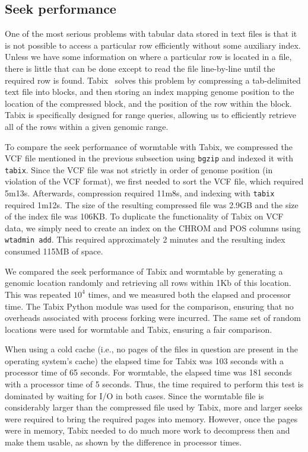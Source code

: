 \documentclass[10pt]{bmc_article}
\newenvironment{bmcformat}{\begin{raggedright}\baselineskip20pt\sloppy\setboolean{publ}{false}}{\end{raggedright}\baselineskip20pt\sloppy}
\begin{document}
\begin{bmcformat}
\subsection*{Seek performance}
One of the most serious problems with tabular data stored in text files
is that it is not possible to access a particular row 
efficiently without some auxiliary 
index. Unless we have some information on where a particular row is located
in a file, there is little that can be done except to read the file 
line-by-line until the required row is found. Tabix~\cite{li11} solves
this problem by compressing a tab-delimited text file into blocks, and 
then storing an index mapping genome position to the location 
of the compressed block, and the position of the row within the block.
Tabix is specifically designed for range queries, allowing us to 
efficiently retrieve all of the rows within a given genomic range.

To compare the seek performance of wormtable with Tabix, we compressed
the VCF file mentioned in the previous subsection using \texttt{bgzip}
and indexed it with \texttt{tabix}. Since the VCF file was not 
strictly in order of genome position (in violation of the VCF format),
we first needed to sort the VCF file, which required 5m13s. 
Afterwards,
compression required 11m8s, and indexing with \texttt{tabix} required
1m12s. The size of the resulting compressed file was 2.9GB and 
the size of the index file was 106KB.
To duplicate the functionality of Tabix on VCF data, we simply need to 
create an index on the CHROM and POS columns using \texttt{wtadmin add}. 
This required approximately
2 minutes and the resulting index consumed 115MB of space.

We compared the seek performance of Tabix and wormtable by generating 
a genomic location randomly and retrieving all rows within 1Kb of
this location. This 
was repeated $10^4$ times, and we measured both the elapsed and 
processor time. The Tabix Python module was used for the 
comparison, ensuring that no overheads associated with process 
forking were incurred. The same set of random locations were used 
for wormtable and Tabix, ensuring a fair comparison.

When using a cold cache (i.e., no pages of the files in question are 
present in the operating system's cache) the elapsed
time for Tabix was 103 seconds with a processor time of 65
seconds. For wormtable, the elapsed time was 181 seconds 
with a processor time of 5 seconds. Thus, the time required 
to perform this test is dominated by waiting for I/O in both 
cases. Since the wormtable file is considerably larger than the 
compressed file used by Tabix, more and larger seeks were required 
to bring the required pages into memory. However, once the 
pages were in memory, Tabix needed to do much more work to 
decompress then and make them usable, as shown by the 
difference in processor times.


\end{bmcformat}
\end{document}

